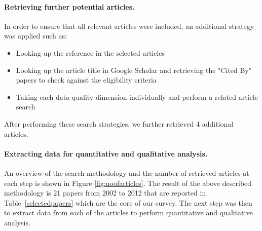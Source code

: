 \paragraph{Retrieving further potential articles.}
In order to ensure that all relevant articles were included, an additional strategy was applied such as:
\begin{itemize}
\item Looking up the reference in the selected articles
\item Looking up the article title in Google Scholar and retrieving the "Cited By" papers to check against the eligibility criteria
\item Taking each data quality dimension individually and perform a related article search
\end{itemize}
After performing these search strategies, we further retrieved 4 additional articles. 

\paragraph{Extracting data for quantitative and qualitative analysis.}
An overview of the search methodology and the number of retrieved articles at each step is shown in Figure \ref{fig:noofarticles}.
The result of the above described methodology is 21 papers from 2002 to 2012 that are reported in Table~\ref{selectedpapers} which are the core of our survey.
The next step was then to extract data from each of the articles to perform quantitative and qualitative analysis.


